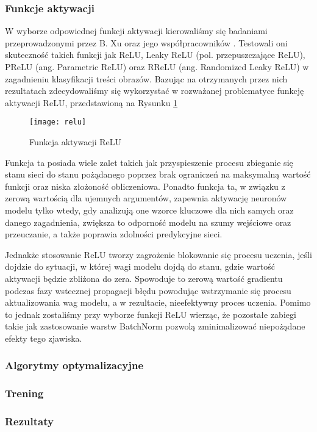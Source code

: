   \subsubsection{Funkcje aktywacji}
  W wyborze odpowiednej funkcji aktywacji kierowaliśmy się badaniami przeprowadzonymi
  przez B. Xu oraz jego współpracowników \cite{evaluatiuon_of_relu}. Testowali
  oni skuteczność takich funkcji jak ReLU, Leaky ReLU (pol. przepuszczające ReLU),
  PReLU (ang. Parametric ReLU) oraz RReLU (ang. Randomized Leaky ReLU) w
  zagadnieniu klasyfikacji treści obrazów. Bazując na otrzymanych przez nich
  rezultatach zdecydowaliśmy się wykorzystać w rozważanej problematyce funkcję
  aktywacji ReLU, przedstawioną na Rysunku \ref{fig:relu}

  \begin{figure}[h]
   \centering
   \texttt{[image: relu]}
   \caption[Funkcja aktywacji ReLU - źródło: \url{https://pytorch.org/docs/stable/_images/ReLU.png}]
   {Funkcja aktywacji ReLU}
   \label{fig:relu}
  \end{figure}

  Funkcja ta posiada wiele zalet takich jak przyspieszenie procesu zbieganie się stanu
  sieci do stanu pożądanego poprzez brak ograniczeń na maksymalną wartość
  funkcji oraz niska złożoność obliczeniowa.
  Ponadto funkcja ta, w związku z zerową wartością dla ujemnych argumentów,
  zapewnia aktywację neuronów modelu tylko wtedy, gdy analizują one wzorce
  kluczowe dla nich samych oraz danego zagadnienia, zwiększa to odporność modelu na
  szumy wejściowe oraz przeuczanie, a także poprawia zdolności predykcyjne sieci.

  Jednakże stosowanie ReLU tworzy zagrożenie blokowanie się procesu uczenia,
  jeśli dojdzie do sytuacji, w której wagi modelu dojdą do stanu, gdzie wartość
  aktywacji będzie zbliżona do zera. Spowoduje to zerową wartość gradientu
  podczas fazy wstecznej propagacji błędu powodując wstrzymanie się procesu
  aktualizowania wag modelu, a w rezultacie, nieefektywny proces uczenia.
  Pomimo to jednak zostaliśmy przy wyborze funkcji ReLU wierząc, że pozostałe
  zabiegi takie jak zastosowanie warstw BatchNorm pozwolą zminimalizować
  niepożądane efekty tego zjawiska.

  \subsubsection{Algorytmy optymalizacyjne}


  \subsubsection{Trening}

  \subsubsection{Rezultaty}
